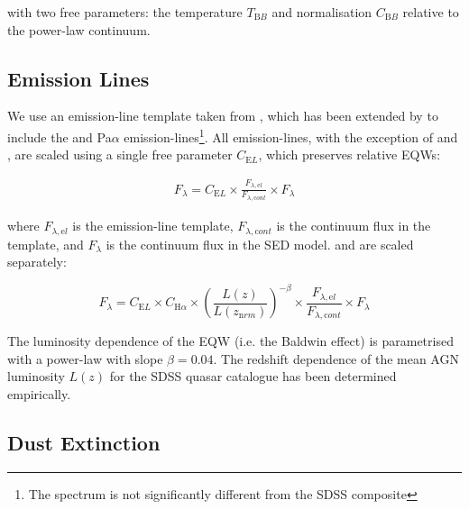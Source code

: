 with two free parameters: the temperature $T_{\mathrm BB}$ and normalisation $C_{\mathrm BB}$ relative to the power-law continuum. 

\subsection{Emission Lines}

We use an emission-line template taken from \citet{francis91}, which has been extended by \citet{maddox06} to include the \ha and Pa$\alpha$ emission-lines\footnote{The spectrum is not significantly different from the \citet{vandenberk01} SDSS composite}. 
All emission-lines, with the exception of \ha and \hb, are scaled using a single free parameter $C_{\mathrm EL}$, which preserves relative EQWs:

\begin{eqnarray}
  F_{\lambda} =  C_{\mathrm EL} \times \frac{F_{\lambda, \mathrm el}}{F_{\lambda, \mathrm cont}} \times F_{\lambda} 
\end{eqnarray} 

where $F_{\lambda, \mathrm el}$ is the emission-line template, $F_{\lambda,\mathrm cont}$ is the continuum flux in the template, and $F_{\lambda}$ is the continuum flux in the SED model.  
\ha and \hb are scaled separately: 

\begin{equation}
  F_{\lambda} =  C_{\mathrm EL} \times C_{{\mathrm H} \alpha} \times \left( \frac{L(z)} {L(z_{\mathrm nrm})} \right)^{-\beta} \times \frac{F_{\lambda, \mathrm el}}{F_{\lambda, \mathrm cont}} \times F_{\lambda} 
\end{equation}

The luminosity dependence of the \ha EQW (i.e. the Baldwin effect) is parametrised with a power-law with slope $\beta=0.04$.
The redshift dependence of the mean AGN luminosity $L(z)$ for the SDSS quasar catalogue has been determined empirically.

\subsection{Dust Extinction}
\label{sec:sed-extinction} 

